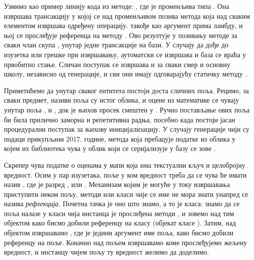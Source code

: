 Узмимо као пример линију кода из  методе: , где је  променљива типа . Она извршава трансакцију у којој се над променљивом  позива метода  која над сваким елементом извршава одређену операцију.  такође као аргумент прима ламбду, и њој се прослеђује референца на методу . Ово резултује у позивању методе  за сваки члан скупа , унутар једне трансакције на бази. У случају да дође до изузетка или грешке при извршавању, аутоматски се извршава  и база се враћа у првобитно стање. Сличан поступак се извршава и за сваки смер и основну школу, независно од генерације, и сви они имају одговарајућу статичку методу .

Приметићемо да унутар сваког ентитета постоји доста сличних поља. Рецимо, за сваки предмет, називи поља су истог облика, и оцене из математике се чувају унутар поља ,  и , док је њихов просек смештен у . Ручно постављање ових поља би била прилично заморна и репетитивна радња, посебно када постоји јасан процедурални поступак за њихову иницијализацију. У случају генерације чији су подаци прикупљани 2017. године, метода која пребацује податке из облика у којем их библиотека чува у облик који се серијализује у базу се зове .

Скрепер чува податке о оценама у мапи која има текстуални кључ и целобројну вредност. Осим у пар изузетака, поље у ком вредност треба да се чува ће имати назив , где је разред ,  или . Механизам којим је могуће у току извршавања приступити неком пољу, методи или класи чије се име не мора знати унапред се назива \emph{рефлекција}. Почетна тачка је оно што знамо, а то је класа: знамо да се поља налазе у класи чија инстанца је прослеђена методи , и зовемо  над тим објектом како бисмо добили референцу на класу (објекат класе ). Затим, над  објектом извршавамо , где је једини аргумент име поља, како бисмо добили референцу на поље. Коначно над пољем извршавамо  коме прослеђујемо  жељену вредност, и инстанцу чијем пољу ту вредност желимо да доделимо.

